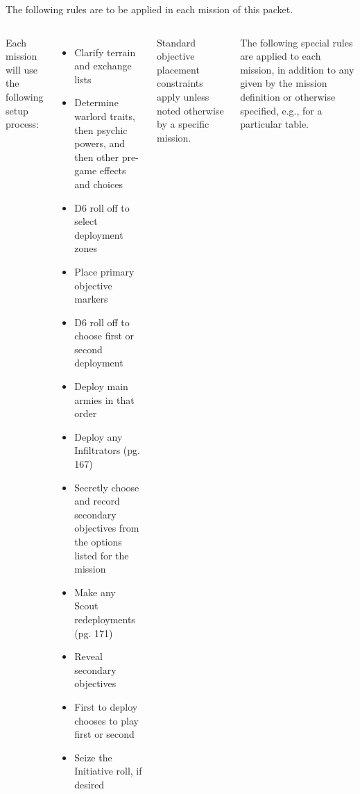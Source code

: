 \clearpage
{}

The following rules are to be applied in each mission of this packet.

\begin{columns}
  
Each mission will use the following setup process:

\begin{itemize}\shortlist
\item Clarify terrain and exchange lists

\item Determine warlord traits, then psychic powers, and then other
  pre-game effects and choices

\item D6 roll off to select deployment zones

\item Place primary objective markers

\item D6 roll off to choose first or second deployment

\item Deploy main armies in that order

\item Deploy any Infiltrators (pg. 167)

\item Secretly choose and record secondary objectives from the options
  listed for the mission

\item Make any Scout redeployments (pg. 171)

\item Reveal secondary objectives

\item First to deploy chooses to play first or second

\item Seize the Initiative roll, if desired

\end{itemize}


Standard objective placement constraints apply unless noted otherwise
by a specific mission.

The following special rules are applied to each mission, in addition
to any given by the mission definition or otherwise specified, e.g.,
for a particular table.


\end{columns}
